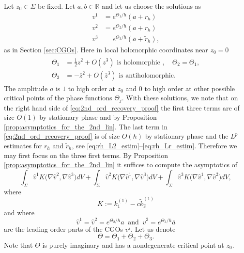 \documentclass[12pt]{amsart}
\def\R{\mathbb R}
\theoremstyle{definition}
\theoremstyle{remark}
\newcommand{\z}{\overline{z}}
\begin{document}
Let $z_0\in \Sigma$ be fixed. Let $a,b\in \R$ and let us choose the solutions as
 \begin{equation}\label{eq:sols_for_second_proof}
 \begin{split}
  v^1&=e^{\Theta_1/h}(a+r_h) \\
  v^2&=e^{\Theta_2/h}(a+r_h) \\
  v^3&=e^{\Theta_3/h}(\overline a+\tilde r_h),
\end{split}
\end{equation}
as in Section \ref{sec:CGOs}. 
Here in local holomorphic coordinates near $z_0=0$ 
\begin{align*}
\begin{split}
\Theta_1&=\frac{1}{2}z^2+O(z^3) \text{ is holomorphic }, \quad \Theta_2=\Theta_1, \\
\Theta_3&=-\z^2+O(\z^3) \text{ is antiholomorphic}.
\end{split}
\end{align*}
The amplitude $a$ is $1$ to high order at $z_0$ and $0$ to high order at other possible critical points of the phase functions $\Theta_j$. 
With these solutions, we note that on the right hand side of \eqref{eq:2nd_ord_recovery_proof} the first three terms are of size $O(1)$ by stationary phase \cite[Theorem 7.7.5]{hormander2015analysis} and by Proposition \ref{prop:asymptotics_for_the_2nd_lin}. The last term in \eqref{eq:2nd_ord_recovery_proof} is of size $O(h)$ by stationary phase and the $L^p$ estimates for $r_h$ and $\tilde r_h$, see \eqref{eq:rh_L2_estim}--\eqref{eq:rh_Lr_estim}. Therefore we may first focus on the three first terms. By Proposition \ref{prop:asymptotics_for_the_2nd_lin} it suffices to compute the asymptotics of 
\[
 \int_{\Sigma} \hat v^1 K(\nabla \hat  v^2,\nabla \hat v^3\big)dV+\int_{\Sigma}\hat v^2 K(\nabla \hat v^1,\nabla \hat v^3\big)dV+\int_{\Sigma}\hat v^3 K(\nabla\hat v^1,\nabla \hat v^2\big)dV,
\]
where  
\[
 K:=k^{(1)}_1-c\tilde k^{(1)}_2
\]
and where 
\[
\hat v^1=\hat v^2=e^{\Theta_2/h}a \ \text{ and } \ \hat v^3=e^{\Theta_3/h}\overline a 
\]
 are the leading order parts of the CGOs $v^j$. Let us denote 
\[
 \Theta =\Theta_1+\Theta_2+\Theta_3.
\]
Note that $\Theta$ is purely imaginary and has a nondegenerate critical point at $z_0$. 
\end{document}
